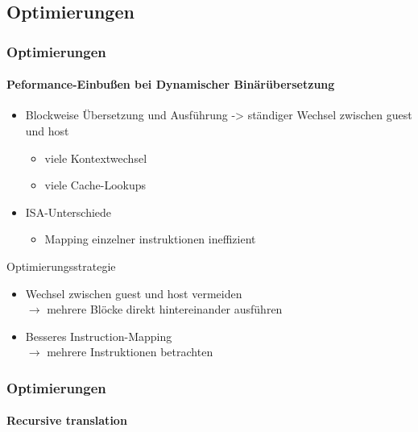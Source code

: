 \subsection{Optimierungen} %
\begin{frame}
	\frametitle{Optimierungen}
	\framesubtitle{Peformance-Einbußen bei Dynamischer Binärübersetzung}
	\begin{itemize}
		\item Blockweise Übersetzung und Ausführung -> ständiger Wechsel zwischen guest und host
		\begin{itemize}
			\item viele Kontextwechsel
			\item viele Cache-Lookups
		\end{itemize}
		\item ISA-Unterschiede
		\begin{itemize}
			\item Mapping einzelner instruktionen ineffizient
		\end{itemize}
	\end{itemize}
	
	\begin{block}{Optimierungsstrategie}
		\begin{itemize}
			\item Wechsel zwischen guest und host vermeiden \\
				$\rightarrow$ mehrere Blöcke direkt hintereinander ausführen
			\item Besseres Instruction-Mapping \\
				$\rightarrow$ mehrere Instruktionen betrachten
		\end{itemize}
	\end{block}
\end{frame}

\begin{frame}
	\frametitle{Optimierungen}
	\framesubtitle{Recursive translation}
\end{frame}

